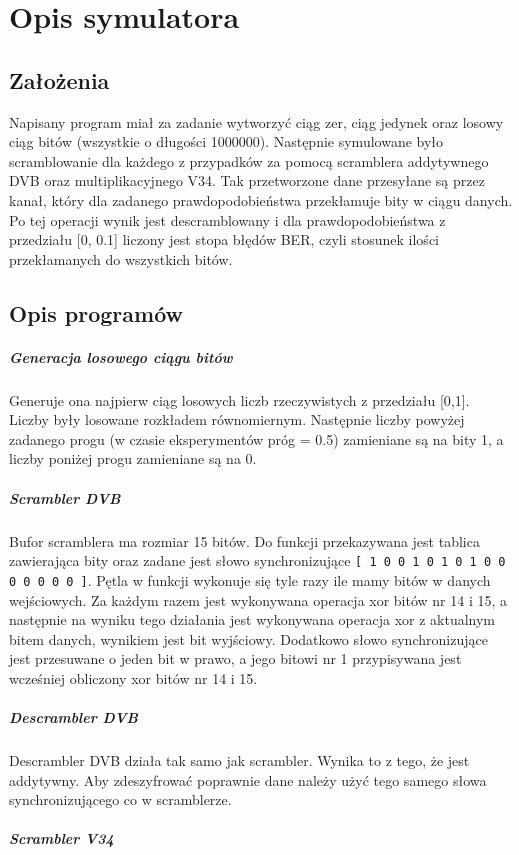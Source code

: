 \documentclass[polish, 11pt]{article}
\begin{document}
\section{Opis symulatora}
    \subsection{Założenia}
     Napisany program miał za zadanie wytworzyć ciąg zer, ciąg jedynek oraz losowy ciąg bitów (wszystkie o długości 1000000). Następnie symulowane było scramblowanie dla każdego z przypadków za pomocą scramblera addytywnego DVB oraz multiplikacyjnego V34. Tak przetworzone dane przesyłane są przez kanał, który dla zadanego prawdopodobieństwa przekłamuje bity w ciągu danych. Po tej operacji wynik jest descramblowany i dla prawdopodobieństwa z przedziału [0, 0.1] liczony jest stopa błędów BER, czyli stosunek ilości przekłamanych do wszystkich bitów.
    \subsection{Opis programów}
    	\subparagraph{Generacja losowego ciągu bitów \\}
    	 Generuje ona najpierw ciąg losowych liczb rzeczywistych z przedziału [0,1]. Liczby były losowane rozkładem równomiernym.
        Następnie liczby powyżej zadanego progu (w czasie eksperymentów próg = 0.5) zamieniane są na bity 1,
        a liczby poniżej progu zamieniane są na 0.
    	\subparagraph{Scrambler DVB\\}
    	Bufor scramblera ma rozmiar 15 bitów. Do funkcji przekazywana jest tablica zawierająca bity  oraz zadane jest słowo synchronizujące \texttt{[ 1 0 0 1 0 1 0 1 0 0 0 0 0 0 0 ]}. Pętla w funkcji wykonuje się tyle razy ile mamy bitów w danych wejściowych. Za każdym razem jest wykonywana operacja xor bitów nr 14 i 15, a następnie na wyniku tego działania jest wykonywana operacja xor z aktualnym bitem danych, wynikiem jest bit wyjściowy. Dodatkowo słowo synchronizujące jest przesuwane o jeden bit w prawo, a jego  bitowi nr 1 przypisywana jest wcześniej obliczony xor bitów nr 14 i 15.
    	\subparagraph{Descrambler DVB\\}
    	Descrambler DVB działa tak samo jak scrambler. Wynika to z tego, że jest addytywny. Aby zdeszyfrować poprawnie dane należy użyć tego samego słowa synchronizującego co w scramblerze.  
    	\subparagraph{Scrambler V34\\}
    
\end{document}
